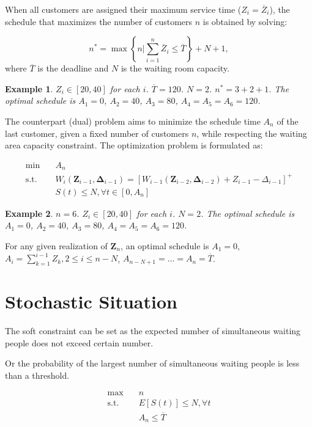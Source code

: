 \documentclass{article}
\newcommand{\Z}{\mathbf{Z}}
\newcommand{\D}{\bm{\Delta}}
\newtheorem{example}{Example}
\begin{document}
When all customers are assigned their maximum service time ($Z_{i} = \overline{Z}_{i}$), the schedule that maximizes the number of customers $n$ is obtained by solving:

$$n^{*} = \max\left\{n\bigg|\sum_{i=1}^{n} \overline{Z}_{i} \leq \overline{T}\right\} + N +1,$$ where $\overline{T}$ is the deadline and $N$ is the waiting room capacity.

\begin{example}
    $Z_{i} \in [20, 40]$ for each $i$. $\overline{T} =120$. $N =2$. $n^{*} = 3 + 2 +1$. The optimal schedule is $A_{1} = 0$, $A_2 = 40$, $A_3 = 80$, $A_4 =A_5 = A_6 = 120$.
\end{example}

The counterpart (dual) problem aims to minimize the schedule time $A_n$ of the last customer, given a fixed number of customers $n$, while respecting the waiting area capacity constraint. The optimization problem is formulated as:

\begin{equation}
    \begin{aligned}
        \min \quad & A_{n} \\
        \mbox{s.t.} \quad & W_{i}(\Z_{i-1}, \D_{i-1}) = [W_{i-1}(\Z_{i-2}, \D_{i-2}) + Z_{i-1} - \Delta_{i-1}]^{+} \\
        & S(t) \leq N, \forall t \in [0, A_n]
    \end{aligned}
\end{equation}


\begin{example}
    $n = 6$. $Z_{i} \in [20, 40]$ for each $i$. $N =2$. The optimal schedule is $A_{1} = 0$, $A_2 = 40$, $A_3 = 80$, $A_4 =A_5 = A_6 = 120$.
\end{example}

For any given realization of $\Z_n$, an optimal schedule is $A_1 = 0$, $A_i = \sum_{k=1}^{i-1} Z_k, 2 \leq i \leq n-N$, $A_{n-N+1} = \ldots = A_{n} = \overline{T}$.


\section{Stochastic Situation}
The soft constraint can be set as the expected number of simultaneous waiting people does not exceed certain number. 

Or the probability of the largest number of simultaneous waiting people is less than a threshold.

\begin{equation}\label{stochastic_model}
    \begin{aligned}
        \max \quad & n \\
        \mbox{s.t.} \quad & E[S(t)] \leq N, \forall t \\
        & A_{n} \leq \overline{T}
    \end{aligned}
\end{equation}
\end{document}
